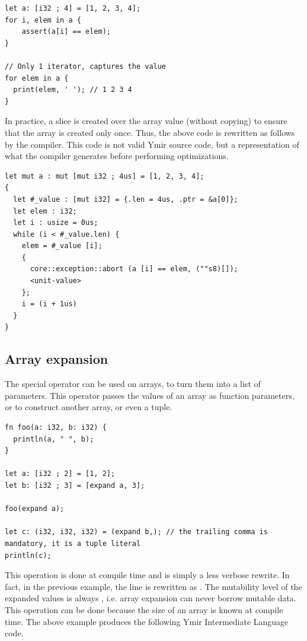 \begin{lstlisting}[style=coloredverbatim]
let a: [i32 ; 4] = [1, 2, 3, 4];
for i, elem in a {
    assert(a[i] == elem);
}

// Only 1 iterator, captures the value
for elem in a {
  print(elem, ' '); // 1 2 3 4
}
\end{lstlisting}

In practice, a slice is created over the array value (without copying) to ensure
that the array is created only once. Thus, the above code is rewritten as
follows by the compiler. This code is not valid Ymir source code, but a
representation of what the compiler generates before performing optimizations.

\begin{lstlisting}[style=myilVerb]
let mut a : mut [mut i32 ; 4us] = [1, 2, 3, 4];
{
  let #_value : [mut i32] = {.len = 4us, .ptr = &a[0]};
  let elem : i32;
  let i : usize = 0us;
  while (i < #_value.len) {
    elem = #_value [i];
    {
      core::exception::abort (a [i] == elem, (""s8)[]);
      <unit-value>
    };
    i = (i + 1us)
  }
}
\end{lstlisting}


\subsection{Array expansion}

The special operator  can be used on arrays, to turn them into a
list of parameters. This operator passes the values of an array as
function parameters, or to construct another array, or even a tuple.

\begin{lstlisting}[style=coloredverbatim]
fn foo(a: i32, b: i32) {
  println(a, " ", b);
}

let a: [i32 ; 2] = [1, 2];
let b: [i32 ; 3] = [expand a, 3];

foo(expand a);

let c: (i32, i32, i32) = (expand b,); // the trailing comma is mandatory, it is a tuple literal
println(c);
\end{lstlisting}

This operation is done at compile time and is simply a less verbose rewrite. In
fact, in the previous example, the line  is rewritten as
. The mutability level of the expanded values is
always , i.e. array expansion can never borrow mutable data. This
operation can be done because the size of an array is known at compile time. The
above example produces the following Ymir Intermediate Language code.


